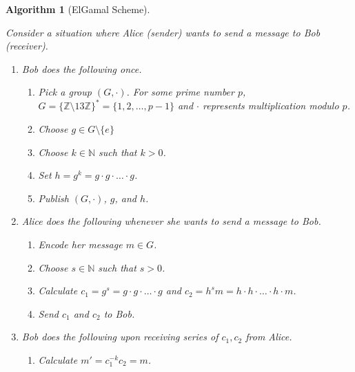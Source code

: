 \documentclass{article}%
\newtheorem{algorithm}[theorem]{Algorithm}
\begin{document}
\begin{algorithm}
[ElGamal Scheme]\ 

Consider a situation where Alice (sender) wants to send a message to Bob (receiver).

\begin{enumerate}
\item Bob does the following once.

\begin{enumerate}
\item Pick a group $(G,\cdot)$. For some prime number $p$, $G=\{ \mathbb{Z}\setminus 13\mathbb{Z} \}^*=\{1,2,\dots,p-1\}$ and $\cdot$ represents multiplication modulo $p$.

\item Choose $g\in G\setminus \{e\}$

\item Choose $k \in \mathbb{N}$ such that $k>0$.

\item Set $h=g^k=g\cdot g\cdot \ldots \cdot g$.

\item Publish $(G, \cdot)$, $g$, and $h$.
\end{enumerate}

\item Alice does the following whenever she wants to send a message to Bob.

\begin{enumerate}
\item Encode her message $m \in G$.
\item Choose $s \in \mathbb{N}$ such that $s>0$.
\item Calculate $c_1 = g^s = g\cdot g \cdot \ldots \cdot g$ and $c_2 = h^sm=h\cdot h \cdot \ldots \cdot h \cdot m$.
\item Send $c_1$ and $c_2$ to Bob.
\end{enumerate}

\item Bob does the following upon receiving series of $c_{1},c_{2}$ from Alice.

\begin{enumerate}
\item Calculate $m'=c_1^{-k}c_2=m$.
\end{enumerate}
\end{enumerate}
\end{algorithm}
\end{document}
